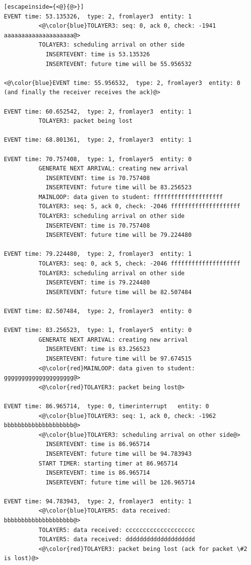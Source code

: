 \documentclass[paper=a4, fontsize=11pt]{scrartcl}
\numberwithin{equation}{section}		%
\numberwithin{figure}{section}			%
\numberwithin{table}{section}				%
\begin{document}
\begin{lstlisting}[escapeinside={<@}{@>}]
EVENT time: 53.135326,  type: 2, fromlayer3  entity: 1
          <@\color{blue}TOLAYER3: seq: 0, ack 0, check: -1941 aaaaaaaaaaaaaaaaaaaa@>
          TOLAYER3: scheduling arrival on other side
            INSERTEVENT: time is 53.135326
            INSERTEVENT: future time will be 55.956532

<@\color{blue}EVENT time: 55.956532,  type: 2, fromlayer3  entity: 0 (and finally the receiver receives the ack)@>

EVENT time: 60.652542,  type: 2, fromlayer3  entity: 1
          TOLAYER3: packet being lost

EVENT time: 68.801361,  type: 2, fromlayer3  entity: 1

EVENT time: 70.757408,  type: 1, fromlayer5  entity: 0
          GENERATE NEXT ARRIVAL: creating new arrival
            INSERTEVENT: time is 70.757408
            INSERTEVENT: future time will be 83.256523
          MAINLOOP: data given to student: ffffffffffffffffffff
          TOLAYER3: seq: 5, ack 0, check: -2046 ffffffffffffffffffff
          TOLAYER3: scheduling arrival on other side
            INSERTEVENT: time is 70.757408
            INSERTEVENT: future time will be 79.224480

EVENT time: 79.224480,  type: 2, fromlayer3  entity: 1
          TOLAYER3: seq: 0, ack 5, check: -2046 ffffffffffffffffffff
          TOLAYER3: scheduling arrival on other side
            INSERTEVENT: time is 79.224480
            INSERTEVENT: future time will be 82.507484

EVENT time: 82.507484,  type: 2, fromlayer3  entity: 0

EVENT time: 83.256523,  type: 1, fromlayer5  entity: 0
          GENERATE NEXT ARRIVAL: creating new arrival
            INSERTEVENT: time is 83.256523
            INSERTEVENT: future time will be 97.674515
          <@\color{red}MAINLOOP: data given to student: gggggggggggggggggggg@>
          <@\color{red}TOLAYER3: packet being lost@>

EVENT time: 86.965714,  type: 0, timerinterrupt   entity: 0
          <@\color{blue}TOLAYER3: seq: 1, ack 0, check: -1962 bbbbbbbbbbbbbbbbbbbb@>
          <@\color{blue}TOLAYER3: scheduling arrival on other side@>
            INSERTEVENT: time is 86.965714
            INSERTEVENT: future time will be 94.783943
          START TIMER: starting timer at 86.965714
            INSERTEVENT: time is 86.965714
            INSERTEVENT: future time will be 126.965714

EVENT time: 94.783943,  type: 2, fromlayer3  entity: 1
          <@\color{blue}TOLAYER5: data received: bbbbbbbbbbbbbbbbbbbb@>
          TOLAYER5: data received: cccccccccccccccccccc
          TOLAYER5: data received: dddddddddddddddddddd
          <@\color{red}TOLAYER3: packet being lost (ack for packet \#2 is lost)@>


\end{lstlisting}
\end{document}

